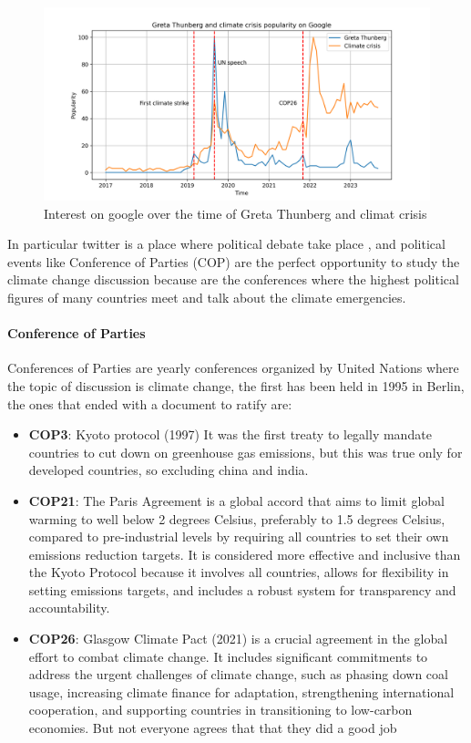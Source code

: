 \begin{figure}
    \centering
    \includegraphics[width=0.85\linewidth]{Chapter1/figures/greta_climate_crisis.png}
    \caption{Interest on google over the time of Greta Thunberg and climat crisis}
    \label{fig:google_greta}
\end{figure}
In particular twitter is a place where political debate take place \cite{Pew_twitter_2022}, and political events like 
Conference of Parties (COP) are the perfect opportunity to study the climate change discussion because are the conferences where the highest political figures of many countries meet and talk about the climate emergencies. 



\paragraph{Conference of Parties}
Conferences of Parties are yearly conferences organized by United Nations where the topic of discussion is climate change, the first has been held in 1995 in Berlin, the ones that ended with a document to ratify are:
\begin{itemize}
    \item \textbf{COP3}: Kyoto protocol (1997) It was the first treaty to legally mandate countries to cut down on greenhouse gas emissions, but this was true only for developed countries, so excluding china and india.
    \item \textbf{COP21}: The Paris Agreement is a global accord that aims to limit global warming to well below 2 degrees Celsius, preferably to 1.5 degrees Celsius, compared to pre-industrial levels by requiring all countries to set their own emissions reduction targets. It is considered more effective and inclusive than the Kyoto Protocol because it involves all countries, allows for flexibility in setting emissions targets, and includes a robust system for transparency and accountability.
    \item \textbf{COP26}: Glasgow Climate Pact (2021) is a crucial agreement in the global effort to combat climate change. It includes significant commitments to address the urgent challenges of climate change, such as phasing down coal usage, increasing climate finance for adaptation, strengthening international cooperation, and supporting countries in transitioning to low-carbon economies. But not everyone agrees that that they did a good job \cite{arora_cop26_2021} \cite{layna_promises_2022} \cite{suresh_climate_2021}
\end{itemize}

